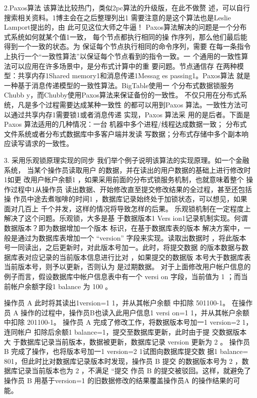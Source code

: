 2.Paxos算法
该算法比较热门，类似2pc算法的升级版，在此不做赘
述，可以自行搜索相关资料。1博主会在之后整理列出1
需要注意的是这个算法也是Leslie Lamport提出的，由
此可见这位大师之牛逼！
Paxos算法解决的问题是一个分布式系统如何就某个值1一致，
每个节点都执行相同的操
作序列，那么他们最后能得到一个一致的状态。为
保证每个节点执行相同的命令序列，需要
在每一条指令上执行一个“一致性算法”以保证每个节点看到的指令一致。一
个通用的一致性算法可以应用在许多场景中，是分布式计算中的重
要问题。节点通信存
在两种模型：共享内存1Shared memory1和消息传递1Messag
es passing1。Paxos算法
就是一种基于消息传递模型的一致性算法。BigTable使用一
个分布式数据锁服务Chubb
y，而Chubby使用Paxos算法来保证备份的一致性。
不仅只用在分布式系统，凡是多个过程需要达成某种一致性
的都可以用到Paxos 
算法。一致性方法可以通过共享内存1需要锁1或者消息传递
实现，Paxos 算法采
用的是后者。下面是Paxos 算法适用的几种情况：一台
机器中多个进程/线程达成数据一致；
分布式文件系统或者分布式数据库中多客户端并发读
写数据；分布式存储中多个副本响应读写请求的一致性。

3. 采用乐观锁原理实现的同步
我们举个例子说明该算法的实现原理。如一个金融系统，
当某个操作员读取用户
的数据，并在读出的用户数据的基础上进行修改时1如更
改用户帐户余额1
，如果采用前面的分布式锁服务机制，也就意味着整个
操作过程中1从操作员
读出数据、开始修改直至提交修改结果的全过程，甚至还包括操
作员中途去煮咖啡的时间1
，数据库记录始终处于加锁状态，可以想见，如果面对几百上
千个并发，这样的情况将导致怎样的后果。
乐观锁机制在一定程度上解决了这个问题。乐观锁，大多是基
于数据版本1 Vers
ion1记录机制实现。何谓数据版本？即为数据增加一个版本
标识，在基于数据库表的版本
解决方案中，一般是通过为数据库表增加一个 “version” 
字段来实现。读取出数据时
，将此版本号一同读出，之后更新时，对此版本号加一。此时，将提交数据
的版本数据与数据库表对应记录的当前版本信息进行比对
，如果提交的数据版
本号大于数据库表当前版本号，则予以更新，否则认为
是过期数据。
对于上面修改用户帐户信息的例子而言，假设数据库中帐户信息表中有一个 versi
on 字段，当前值为 1 ；而当前帐户余额字段1 balance 
为 100 。

操作员 A 此时将其读出1version=1 1，并从其帐户余额
中扣除 501100-1。
在操作员 A 操作的过程中，操作员B也读入此用户信息1 versi
on=1 1，并从其帐户余额中扣除 201100-1。
操作员 A 完成了修改工作，将数据版本号加一1 version=2 1，连同帐户
扣除后余额1 balance=1，提交至数据库更新，此时由于提
交数据版本大
于数据库记录当前版本，数据被更新，数据库记录 version 更新为 2 。
操作员 B 完成了操作，也将版本号加一1 version=2 1试图向数据库提交数
据1 balance= 801，但此时比对数据库记录版本时发现，操作员 B 提交
的数据版本号为 2 ，数据库记录当前版本也为 2 ，不满足 “提交
作员 B 的提交被驳回。这样，就避免了操作员 B 用基于version=1 
的旧数据修改的结果覆盖操作员A 的操作结果的可能。
